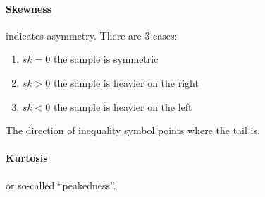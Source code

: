 \paragraph{Skewness} indicates asymmetry. There are 3 cases:
\begin{enumerate}
  \item $sk = 0$ the sample is symmetric
  \item $sk > 0$ the sample is heavier on the right
  \item $sk < 0$ the sample is heavier on the left
\end{enumerate}

\noindent The direction of inequality symbol points where the tail is.

\paragraph{Kurtosis} or so-called ``peakedness''.
